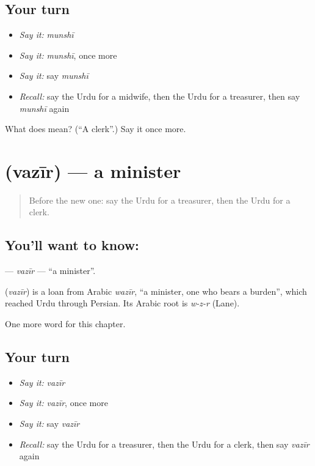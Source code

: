 \subsection*{Your turn}
\begin{itemize}
\raggedright
  \item \emph{Say it:} \emph{munshī}
  \item \emph{Say it:} \emph{munshī}, once more
  \item \emph{Say it:} say \emph{munshī}
  \item \emph{Recall:} say the Urdu for a midwife, then the Urdu for a treasurer, then say \emph{munshī} again
\end{itemize}

\begin{tcolorbox}[breakable,colback=teal!4,colframe=teal!35!black,title={Before you move on}]
What does  mean? (\textquotedblleft{}A clerk\textquotedblright{}.) Say it once more.
\end{tcolorbox}
\section[\texorpdfstring{\ur{وزیر} (vazīr)}{وزیر (vazīr)}]{ (vazīr) — a minister}

\label{lesson:UR-C179-vazir}



\begin{quote}
Before the new one: say the Urdu for a treasurer, then the Urdu for a clerk.
\end{quote}

\subsection*{You'll want to know: }
\textbf{} — \emph{vazīr} — \textquotedblleft{}a minister\textquotedblright{}.

\begin{cousinweb}
\textbf{} (\emph{vazīr}) is a loan from Arabic \emph{wazīr}, \textquotedblleft{}a minister, one who bears a burden\textquotedblright{}, which reached Urdu through Persian. Its Arabic root is \emph{w-z-r} (Lane).
\end{cousinweb}

\begin{grammarlens}[title={What you've built}]
One more word for this chapter.
\end{grammarlens}

\subsection*{Your turn}
\begin{itemize}
\raggedright
  \item \emph{Say it:} \emph{vazīr}
  \item \emph{Say it:} \emph{vazīr}, once more
  \item \emph{Say it:} say \emph{vazīr}
  \item \emph{Recall:} say the Urdu for a treasurer, then the Urdu for a clerk, then say \emph{vazīr} again
\end{itemize}

